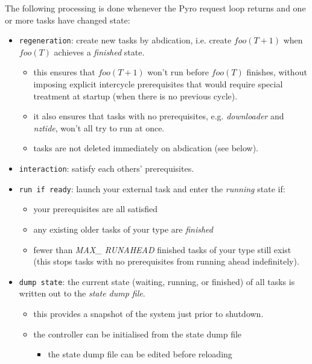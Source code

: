 \documentclass[a4paper,12pt]{amsart}
\begin{document}
The following processing is done whenever the Pyro request loop returns
and one or more tasks have changed state: 

    \begin{itemize} 
    \item \verb#regeneration#: create new tasks by abdication, i.e.
    create $foo(T+1)$ when $foo(T)$ achieves a {\em finished} state.
    \begin{itemize}
    \item this ensures that $foo(T+1)$ won't run before $foo(T)$
    finishes, without imposing explicit intercycle prerequisites
    that would require special treatment at startup (when there is no
    previous cycle). 
    \item it also ensures that tasks with no prerequisites, e.g.
    {\em downloader} and {\em nztide}, won't all try to run at once.
    \item tasks are not deleted immediately on abdication (see below). 
    \end{itemize}


    \item \verb#interaction#: satisfy each others' prerequisites. 

    \item \verb#run if ready#: launch your external task and enter the
    {\em running} state if:
        \begin{itemize}
        \item your prerequisites are all satisfied
        \item any existing older tasks of your type are {\em finished} 
        \item fewer than {\em MAX\_ RUNAHEAD} finished tasks of your
        type still exist (this stops tasks with no prerequisites from
        running ahead indefinitely).
        \end{itemize}

    \item \verb#dump state#: the current state (waiting, running, or
    finished) of all tasks is written out to the {\em state dump file}.
        \begin{itemize}
        \item this provides a snapshot of the system just prior to shutdown.

        \item the controller can be initialised from the state dump file
            \begin{itemize}
            \item the state dump file can be edited before reloading


\end{itemize}
\end{itemize}
\end{itemize}
\end{document}

